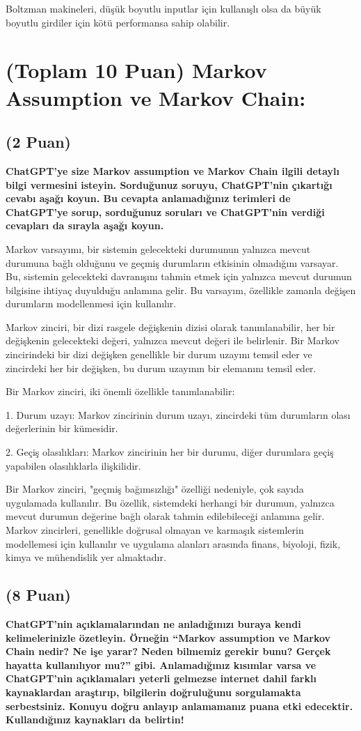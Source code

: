\documentclass[11pt]{article}
\begin{document}
Boltzman makineleri, düşük boyutlu inputlar için kullanışlı olsa da büyük boyutlu girdiler için kötü performansa sahip olabilir.


\section{(Toplam 10 Puan) Markov Assumption ve Markov Chain:}

\subsection{(2 Puan)} \textbf{ChatGPT’ye size Markov assumption ve Markov Chain ilgili detaylı bilgi vermesini isteyin. Sorduğunuz soruyu, ChatGPT'nin çıkartığı cevabı aşağı koyun. Bu cevapta anlamadığınız terimleri de ChatGPT’ye sorup, sorduğunuz soruları ve ChatGPT’nin verdiği cevapları da sırayla aşağı koyun.}

Markov varsayımı, bir sistemin gelecekteki durumunun yalnızca mevcut durumuna bağlı olduğunu ve geçmiş durumların etkisinin olmadığını varsayar. Bu, sistemin gelecekteki davranışını tahmin etmek için yalnızca mevcut durumun bilgisine ihtiyaç duyulduğu anlamına gelir. Bu varsayım, özellikle zamanla değişen durumların modellenmesi için kullanılır.

Markov zinciri, bir dizi rasgele değişkenin dizisi olarak tanımlanabilir, her bir değişkenin gelecekteki değeri, yalnızca mevcut değeri ile belirlenir. Bir Markov zincirindeki bir dizi değişken genellikle bir durum uzayını temsil eder ve zincirdeki her bir değişken, bu durum uzayının bir elemanını temsil eder.

Bir Markov zinciri, iki önemli özellikle tanımlanabilir:

1. Durum uzayı: Markov zincirinin durum uzayı, zincirdeki tüm durumların olası değerlerinin bir kümesidir.

2. Geçiş olasılıkları: Markov zincirinin her bir durumu, diğer durumlara geçiş yapabilen olasılıklarla ilişkilidir.

Bir Markov zinciri, "geçmiş bağımsızlığı" özelliği nedeniyle, çok sayıda uygulamada kullanılır. Bu özellik, sistemdeki herhangi bir durumun, yalnızca mevcut durumun değerine bağlı olarak tahmin edilebileceği anlamına gelir. Markov zincirleri, genellikle doğrusal olmayan ve karmaşık sistemlerin modellemesi için kullanılır ve uygulama alanları arasında finans, biyoloji, fizik, kimya ve mühendislik yer almaktadır.


\subsection{(8 Puan)} \textbf{ChatGPT’nin açıklamalarından ne anladığınızı buraya kendi kelimelerinizle özetleyin. Örneğin ``Markov assumption ve Markov Chain nedir? Ne işe yarar? Neden bilmemiz gerekir bunu? Gerçek hayatta kullanılıyor mu?'' gibi. Anlamadığınız kısımlar varsa ve ChatGPT’nin açıklamaları yeterli gelmezse internet dahil farklı kaynaklardan araştırıp, bilgilerin doğruluğunu sorgulamakta serbestsiniz. Konuyu doğru anlayıp anlamamanız puana etki edecektir. Kullandığınız kaynakları da belirtin!}
\end{document}
